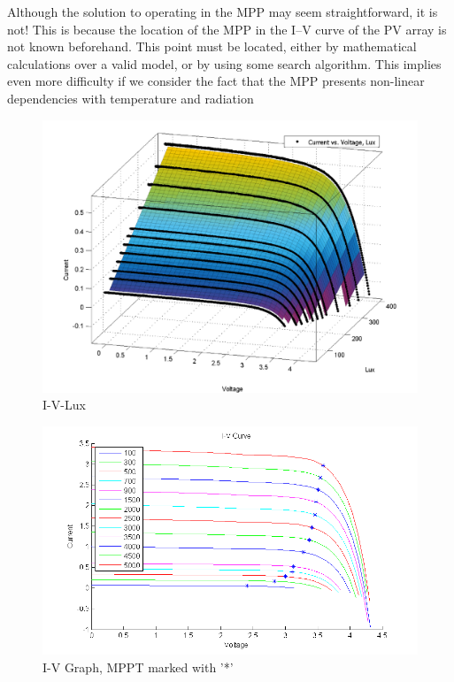 Although the solution to operating in the \ac{MPP} may seem straightforward, it is not! This is because the location of the \ac{MPP} in the I–V curve of the PV array is not known beforehand. This point must be located, either by mathematical calculations over a valid model, or by using some search algorithm. This implies even more difficulty if we consider the fact that the \ac{MPP} presents non-linear dependencies with temperature and radiation\cite{enrique2010reliable}\\





  \begin{figure}[H]
  \begin{center}
  \includegraphics[width=\textwidth]{images/I-V-lux}
  \caption{I-V-Lux}
  \label{fig:IVgraph}
  \end{center}
  \end{figure}
  
    \begin{figure}[H]
    \begin{center}
    \includegraphics[width=\textwidth]{images/IV_lux_MPP}
    \caption{I-V Graph, MPPT marked with '*'}
    \label{fig:IV_mppgraph}
    \end{center}
    \end{figure}
  
